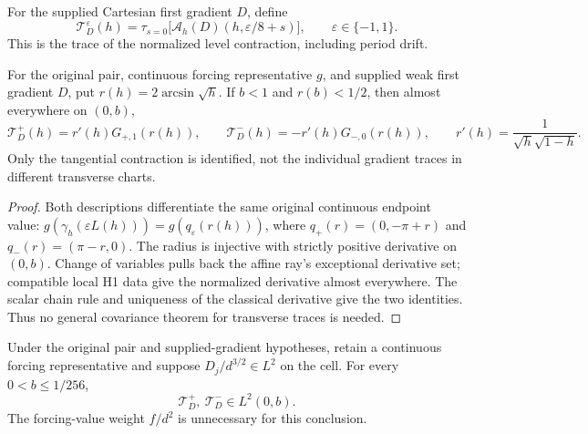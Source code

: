 \begin{definition}
\label{def:quarter-endpoint-level-trace}
\leanok
For the supplied Cartesian first gradient $D$, define
\[
 \mathscr T_D^\varepsilon(h)=
 \tau_{s=0}\bigl[\mathcal A_h(D)(h,\varepsilon/8+s)\bigr],
 \qquad \varepsilon\in\{-1,1\}.
\]
This is the trace of the normalized level contraction, including period drift.
\end{definition}

\begin{lemma}
\label{lem:endpoint-tangential-trace-identity}
\leanok
For the original pair, continuous forcing representative $g$, and supplied weak
first gradient $D$, put $r(h)=2\arcsin\sqrt h$.
If $b<1$ and $r(b)<1/2$, then almost everywhere on $(0,b)$,
\[
 \mathscr T_D^+(h)=r'(h)G_{+,1}(r(h)),\qquad
 \mathscr T_D^-(h)=-r'(h)G_{-,0}(r(h)),
 \qquad r'(h)=\frac1{\sqrt h\sqrt{1-h}}.
\]
Only the tangential contraction is identified, not the individual gradient
traces in different transverse charts.
\end{lemma}

\begin{proof}
\leanok
Both descriptions differentiate the same original continuous endpoint value:
$g(\gamma_h(\varepsilon L(h)))=g(q_\varepsilon(r(h)))$, where
$q_+(r)=(0,-\pi+r)$ and $q_-(r)=(\pi-r,0)$.
The radius is injective with strictly positive derivative on $(0,b)$.
Change of variables pulls back the affine ray's exceptional derivative set;
compatible local H1 data give the normalized derivative almost everywhere.
The scalar chain rule and uniqueness of the classical derivative give the
two identities. Thus no general covariance theorem for transverse traces is needed.
\end{proof}

\begin{lemma}
\label{lem:weighted-endpoint-tangential-trace}
\leanok
Under the original pair and supplied-gradient hypotheses, retain a continuous
forcing representative and suppose $D_j/d^{3/2}\in L^2$ on the cell.
For every $0<b\le1/256$,
\[
 \mathscr T_D^+,\ \mathscr T_D^-\in L^2(0,b).
\]
The forcing-value weight $f/d^2$ is unnecessary for this conclusion.
\end{lemma}

